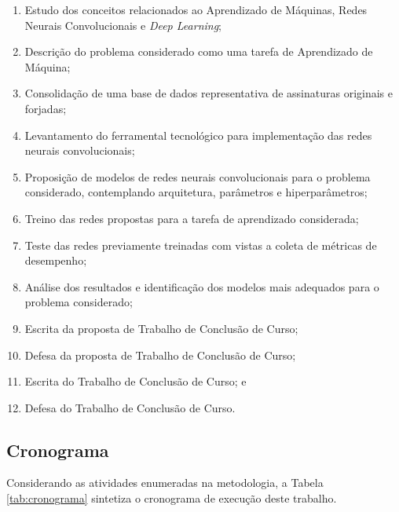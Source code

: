 \begin{enumerate}
  \item Estudo dos conceitos relacionados ao Aprendizado de Máquinas, Redes Neurais Convolucionais e \emph{Deep Learning};
  \item Descrição do problema considerado como uma tarefa de Aprendizado de Máquina;
  \item Consolidação de uma base de dados representativa de assinaturas originais e forjadas;
  \item Levantamento do ferramental tecnológico para implementação das redes neurais convolucionais;
  \item Proposição de modelos de redes neurais convolucionais para o problema considerado, contemplando arquitetura, parâmetros e hiperparâmetros;
  \item Treino das redes propostas para a tarefa de aprendizado considerada;
  \item Teste das redes previamente treinadas com vistas a coleta de métricas de desempenho;
  \item Análise dos resultados e identificação dos modelos mais adequados para o problema considerado;
  \item Escrita da proposta de Trabalho de Conclusão de Curso;
  \item Defesa da proposta de Trabalho de Conclusão de Curso;
  \item Escrita do Trabalho de Conclusão de Curso; e
  \item Defesa do Trabalho de Conclusão de Curso.
\end{enumerate}

\subsection{Cronograma}

Considerando as atividades enumeradas na metodologia, a Tabela \ref{tab:cronograma} sintetiza o cronograma de execução deste trabalho.

